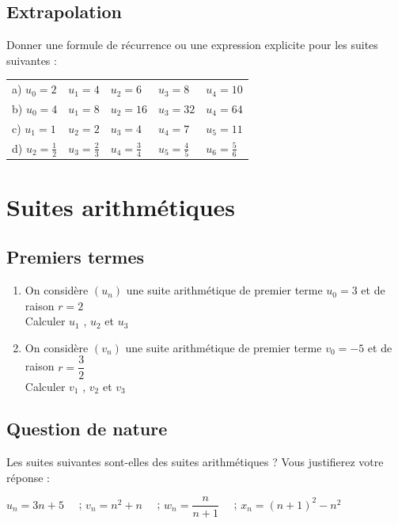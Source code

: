 \documentclass[oneside,12pt]{article}          %
\begin{document}
\subsection{Extrapolation}
Donner une formule de récurrence ou une expression explicite pour les suites suivantes :

\renewcommand{\arraystretch}{1.6}
\begin{tabular}{p{} p{} p{} p{} p{}}
    a) $u_0 = 2$ & $u_1 = 4$ & $u_2 = 6$ & $u_3 = 8$ & $u_4 = 10$ \\
    b) $u_0 = 4 $ & $ u_1 = 8$ & $u_2 = 16$ & $u_3 = 32$ & $u_4 = 64$ \\
    c) $u_1 = 1$ & $u_2 = 2$ & $u_3 = 4$ & $u_4 = 7$ & $u_5 = 11$ \\
    d) $u_2 = \frac{1}{2}$ & $u_3 = \frac{2}{3}$ & $u_4 = \frac{3}{4}$ & $u_5 = \frac{4}{5}$ & $u_6 = \frac{5}{6}$ 
\end{tabular}



\section{Suites arithmétiques}

\subsection{Premiers termes}
\begin{enumerate}
	\item On considère $(u_n)$ une suite arithmétique de premier terme $u_0 = 3$ et de raison $r = 2$ \\
	Calculer $u_1$ , $u_2$ et $u_3$
	\item On considère $(v_n)$ une suite arithmétique de premier terme $v_0 = -5$ et de raison $r = \dfrac{3}{2}$ \\
	Calculer $v_1$ , $v_2$ et $v_3$
\end{enumerate}



\subsection{Question de nature}
Les suites suivantes sont-elles des suites arithmétiques ? Vous justifierez votre réponse :

\hspace{2cm} $u_n = 3n + 5 \quad$ ; \quad $v_n = n^2 + n \quad$ ; \quad $w_n = \dfrac{n}{n+1} \quad$ ; \quad $x_n = (n+1)^2 - n^2$
\end{document}
